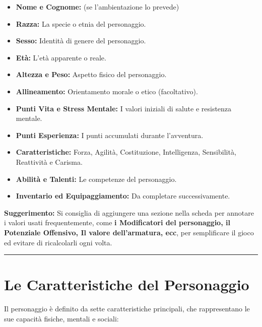 \documentclass[../manuale_main.tex]{subfiles}
\begin{document}
\begin{itemize}
    \item \textbf{Nome e Cognome:} (se l'ambientazione lo prevede)
    \item \textbf{Razza:} La specie o etnia del personaggio.
    \item \textbf{Sesso:} Identità di genere del personaggio.
    \item \textbf{Età:} L’età apparente o reale.
    \item \textbf{Altezza e Peso:} Aspetto fisico del personaggio.
    \item \textbf{Allineamento:} Orientamento morale o etico (facoltativo).
    \item \textbf{Punti Vita e Stress Mentale:} I valori iniziali di salute e resistenza mentale.
    \item \textbf{Punti Esperienza:} I punti accumulati durante l'avventura.
    \item \textbf{Caratteristiche:} Forza, Agilità, Costituzione, Intelligenza, Sensibilità, Reattività e Carisma.
    \item \textbf{Abilità e Talenti:} Le competenze del personaggio.
    \item \textbf{Inventario ed Equipaggiamento:} Da completare successivamente.
\end{itemize}

\textbf{Suggerimento:} Si consiglia di aggiungere una sezione nella scheda per annotare i valori usati frequentemente, come \textbf{i Modificatori del personaggio, il Potenziale Offensivo, Il valore dell'armatura, ecc}, per semplificare il gioco ed evitare di ricalcolarli ogni volta.

\vspace{0.5cm}\noindent\centering\rule{\textwidth}{0.4pt}\vspace{0.5cm}

\section{Le Caratteristiche del Personaggio}
Il personaggio è definito da sette caratteristiche principali, che rappresentano le sue capacità fisiche, mentali e sociali:
\end{document}

